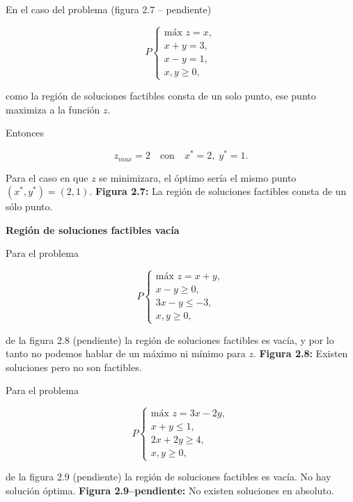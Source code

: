 \begin{Ejem} En el caso del problema (figura 2.7 -- pendiente)

\[
P
\begin{cases}
\text{m\'ax } z = x,\\
x + y = 3,\\
x - y = 1,\\
x,y \ge 0,
\end{cases}
\]

como la regi\'on de soluciones factibles consta de un solo punto, ese punto maximiza a la funci\'on $z$.

Entonces

\[
z_{max}=2 \quad \text{con} \quad x^{*}=2,\; y^{*}=1.
\]

Para el caso en que $z$ se minimizara, el \'optimo ser\'ia el mismo punto $(x^{*},y^{*})=(2,1)$. \textbf{Figura 2.7:} La regi\'on de soluciones factibles consta de un s\'olo punto.
\end{Ejem}

\textbf{Regi\'on de soluciones factibles vac\'ia}

\begin{Ejem} Para el problema

\[
P
\begin{cases}
\text{m\'ax } z = x + y, \\
x - y \ge 0, \\
3x - y \le -3, \\
x,y \ge 0,
\end{cases}
\]

de la figura 2.8 (pendiente) la regi\'on de soluciones factibles es vac\'ia, y por lo tanto no podemos hablar de un m\'aximo ni m\'inimo para $z$. \textbf{Figura 2.8:} Existen soluciones pero no son factibles.
\end{Ejem}

\begin{Ejem} Para el problema

\[
P
\begin{cases}
\text{m\'ax } z = 3x - 2y, \\
x + y \le 1, \\
2x + 2y \ge 4, \\
x,y \ge 0,
\end{cases}
\]

de la figura 2.9 (pendiente) la regi\'on de soluciones factibles es vac\'ia. No hay soluci\'on \'optima. \textbf{Figura 2.9--pendiente:} No existen soluciones en absoluto.
\end{Ejem}


